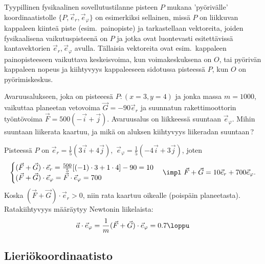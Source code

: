 Tyypillinen fysikaalinen sovellutustilanne pisteen $P$ mukana 'pyörivälle' koordinaatistolle 
$\{P,\vec e_r,\vec e_\varphi\}$ on esimerkiksi sellainen, missä $P$ on liikkuvan kappaleen 
kiinteä piste (esim.\ painopiste) ja tarkastellaan vektoreita, joiden fysikaalisena 
vaikutuspisteenä on $P$ ja jotka ovat luontevasti esitettävissä kantavektorien 
$\vec e_r,\vec e_\varphi$ avulla. Tällaisia vektoreita ovat esim.\ kappaleen painopisteeseen 
vaikuttava keskeisvoima, kun voimakeskuksena on $O$, tai pyörivän kappaleen nopeus ja kiihtyvyys
kappaleeseen sidotussa pisteessä $P$, kun $O$ on pyörimiskeskus.
\begin{Exa}
Avaruusalukseen, joka on pisteeesä $P:(x=3, y=4)$ ja jonka massa $m=1000$, vaikuttaa planeetan 
vetovoima $\vec G=-90\vec e_r$ ja suunnatun rakettimoottorin työntövoima 
$\vec F=500(-\vec i + \vec j)$. Avaruusalus on liikkeessä suuntaan $\vec e_\varphi$. Mihin 
suuntaan liikerata kaartuu, ja mikä on aluksen kiihtyvyys liikeradan suuntaan\,?
\end{Exa}
\ratk Pisteessä $P$ on $\vec e_r = \frac{1}{5}(3\vec i + 4\vec j)$, 
$\,\vec e_\varphi = \frac{1}{5}(-4\vec i + 3\vec j)$, joten
\[ \begin{cases}
(\vec F + \vec G) \cdot \vec e_r = \frac{500}{5}[(-1) \cdot 3 + 1 \cdot 4] - 90 =10 \\
(\vec F + \vec G) \cdot \vec e_\varphi = \vec F \cdot \vec e_\varphi = 700
\end{cases} 
\impl\ \vec F + \vec G = 10 \vec e_r + 700 \vec e_\varphi.
\]
Koska $(\vec F + \vec G) \cdot \vec e_r >0$, niin rata kaartuu oikealle (poispäin planeetasta).
Ratakiihtyvyys määräytyy Newtonin liikelaista:
\[
\vec a \cdot \vec e_\varphi = \frac{1}{m}(\vec F + \vec G) \cdot \vec e_\varphi = 0.7 \loppu 
\]

\subsection{Lieriökoordinaatisto}

